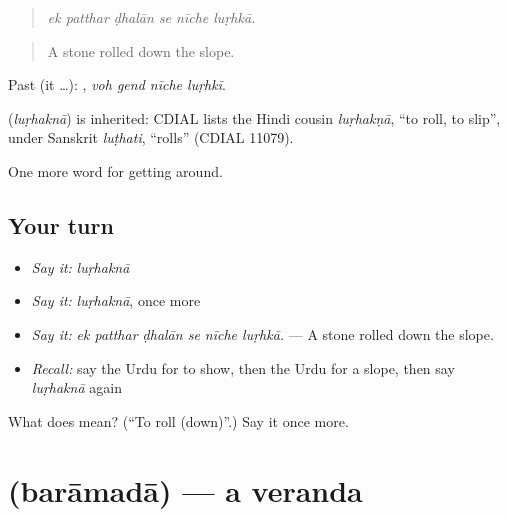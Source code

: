 \begin{quote}
     
\end{quote}

\begin{quote}
\emph{ek patthar ḍhalān se nīche luṛhkā.}
\end{quote}

\begin{quote}
A stone rolled down the slope.
\end{quote}

Past (it …):    , \emph{voh gend nīche luṛhkī}.

\begin{cousinweb}
\textbf{} (\emph{luṛhaknā}) is inherited: CDIAL lists the Hindi cousin \emph{luṛhakṇā}, \textquotedblleft{}to roll, to slip\textquotedblright{}, under Sanskrit \emph{luṭhati}, \textquotedblleft{}rolls\textquotedblright{} (CDIAL 11079).
\end{cousinweb}

\begin{grammarlens}[title={What you've built}]
One more word for getting around.
\end{grammarlens}

\subsection*{Your turn}
\begin{itemize}
\raggedright
  \item \emph{Say it:} \emph{luṛhaknā}
  \item \emph{Say it:} \emph{luṛhaknā}, once more
  \item \emph{Say it:} \emph{ek patthar ḍhalān se nīche luṛhkā.} — A stone rolled down the slope.
  \item \emph{Recall:} say the Urdu for to show, then the Urdu for a slope, then say \emph{luṛhaknā} again
\end{itemize}

\begin{tcolorbox}[breakable,colback=teal!4,colframe=teal!35!black,title={Before you move on}]
What does  mean? (\textquotedblleft{}To roll (down)\textquotedblright{}.) Say it once more.
\end{tcolorbox}
\section[\texorpdfstring{\ur{برآمدہ} (barāmadā)}{برآمدہ (barāmadā)}]{ (barāmadā) — a veranda}

